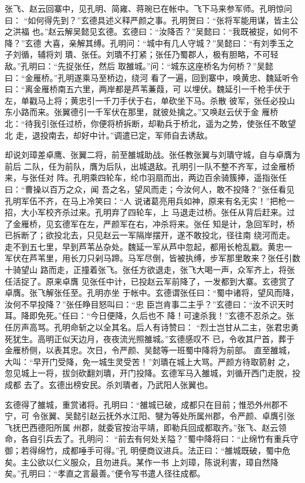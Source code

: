 张飞、赵云回寨中，见孔明、简雍、蒋琬已在帐中。飞下马来参军师。孔明惊问曰：
“如何得先到？”玄德具述义释严颜之事。孔明贺曰：“张将军能用谋，皆主公之洪福
也。”赵云解吴懿见玄德。玄德曰：“汝降否？”吴懿曰：“我既被捉，如何不降？”玄德
大喜，亲解其缚。孔明问：“城中有几人守城？”吴懿曰：“有刘季玉之子刘循，辅将刘
璝、张任。刘璝不打紧；张任乃蜀郡人，极有胆略，不可轻敌。”孔明曰：“先捉张任，然后
取雒城。”问：“城东这座桥名为何桥？”吴懿曰：“金雁桥。”孔明遂乘马至桥边，绕河
看了一遍，回到寨中，唤黄忠、魏延听令曰：“离金雁桥南五六里，两岸都是芦苇蒹葭，可
以埋伏。魏延引一千枪手伏于左，单戳马上将；黄忠引一千刀手伏于右，单砍坐下马。杀散
彼军，张任必投山东小路而来。张翼德引一千军伏在那里，就彼处擒之。”又唤赵云伏于金
雁桥北：“待我引张任过桥，你便将桥拆断，却勒兵于桥北，遥为之势，使张任不敢望北
走，退投南去，却好中计。”调遣已定，军师自去诱敌。

却说刘璋差卓鹰、张翼二将，前至雒城助战。张任教张翼与刘璝守城，自与卓膺为前后
二队，任为前队，膺为后队，出城退敌。孔明引一队不整不齐军，过金雁桥来，与张任对
阵。孔明乘四轮车，纶巾羽扇而出，两边百余骑簇捧，遥指张任曰：“曹操以百万之众，闻
吾之名，望风而走；今汝何人，敢不投降？”张任看见孔明军伍不齐，在马上冷笑曰：“人
说诸葛亮用兵如神，原来有名无实！”把枪一招，大小军校齐杀过来。孔明弃了四轮车，上
马退走过桥。张任从背后赶来。过了金雁桥，见玄德军在左，严颜军在右，冲杀将来。张任
知是计，急回军时，桥已拆断了；欲投北去，只见赵云一军隔岸摆开，遂不敢投北，径往南
绕河而走。走不到五七里，早到芦苇丛杂处。魏延一军从芦中忽起，都用长枪乱戳。黄忠一
军伏在芦苇里，用长刀只剁马蹄。马军尽倒，皆被执缚，步军那里敢来？张任引数十骑望山
路而走，正撞着张飞。张任方欲退走，张飞大喝一声，众军齐上，将张任活捉了。原来卓膺
见张任中计，已投赵云军前降了，一发都到大寨。玄德赏了卓膺。张飞解张任至。孔明亦坐
于帐中。玄德谓张任曰：“蜀中诸将，望风而降，汝何不早投降？”张任睁目怒叫曰：“忠
臣岂肯事二主乎？”玄德曰：“汝不识天时耳。降即免死。”任曰：“今日便降，久后也不
降！可速杀我！”玄德不忍杀之。张任厉声高骂。孔明命斩之以全其名。后人有诗赞曰：
“烈士岂甘从二主，张君忠勇死犹生。高明正似天边月，夜夜流光照雒城。”玄德感叹不
已，令收其尸首，葬于金雁桥侧，以表其忠。次日，令严颜、吴懿等一班蜀中降将为前部。
直至雒城，大叫：“早开门受降，免一城生灵受苦！”刘璝在城上大骂。严颜方待取箭射
之，忽见城上一将，拔剑砍翻刘璝，开门投降。玄德军马入雒城，刘循开西门走脱，投成都
去了。玄德出榜安民。杀刘璝者，乃武阳人张翼也。

玄德得了雒城，重赏诸将。孔明曰：“雒城已破，成都只在目前；惟恐外州郡不宁，可
令张翼、吴懿引赵云抚外水江阳、犍为等处所属州郡，令严颜、卓膺引张飞抚巴西德阳所属
州郡，就委官按治平靖，即勒兵回成都取齐。”张飞、赵云领命，各自引兵去了。孔明问：
“前去有何处关隘？”蜀中降将曰：“止绵竹有重兵守御；若得绵竹，成都唾手可得。”孔
明便商议进兵。法正曰：“雒城既破，蜀中危矣。主公欲以仁义服众，且勿进兵。某作一书
上刘璋，陈说利害，璋自然降矣。”孔明曰：“孝直之言最善。”便令写书遣人径往成都。

